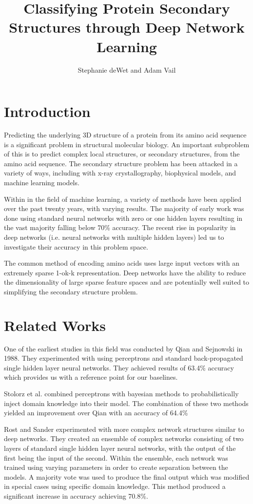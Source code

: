 \documentclass[letterpaper,twocolumn,12pt]{article}
\title{Classifying Protein Secondary Structures through Deep Network Learning}
\author{Stephanie deWet and Adam Vail}
\begin{document}
\maketitle

\section{Introduction}
\label{subsec:intro}
Predicting the underlying 3D structure of a protein from its amino acid sequence is a significant problem in structural molecular biology.
An important subproblem of this is to predict complex local structures, or secondary structures, from the amino acid sequence.  
The secondary structure problem has been attacked in a variety of ways, including with x-ray crystallography, biophysical models, and machine learning models.

Within in the field of machine learning, a variety of methods have been applied  over the past twenty years, with varying results. 
The majority of early work was done using standard neural networks with zero or one hidden layers resulting in the vast majority falling below 70\% accuracy.
The recent rise in popularity in deep networks (i.e. neural networks with multiple hidden layers) led us to investigate their accuracy in this problem space.

The common method of encoding amino acids uses large input vectors with an extremely sparse 1-ok-k representation.
Deep networks have the ability to reduce the dimensionality of large sparse feature spaces and are potentially well suited to simplifying the secondary structure problem.

\section{Related Works}
\label{subsec:relatedworks}
One of the earliest studies in this field was conducted by Qian and Sejnowski \cite{Qian} in 1988.
They experimented with using perceptrons and standard back-propagated single hidden layer neural networks.
They achieved results of 63.4\% accuracy which provides us with a reference point for our baselines.

Stolorz et al. combined perceptrons with bayesian methods to probabilistically inject domain knowledge into their model.
The combination of these two methods yielded an improvement over Qian with an accuracy of 64.4\%

Rost and Sander experimented with more complex network structures similar to deep networks.
They created an ensemble of complex networks consisting of two layers of standard single hidden layer neural networks, with the output of the first being the input of the second.
Within the ensemble, each network was trained using varying parameters in order to create separation between the models.
A majority vote was used to produce the final output which was modified in special cases using specific domain knowledge.
This method produced a significant increase in accuracy achieving 70.8\%.
\end{document}
